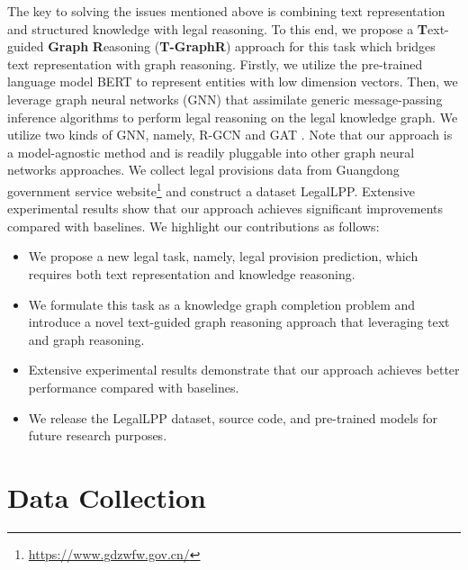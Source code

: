 \documentclass[runningheads]{llncs}
\begin{document}
The key to solving the issues mentioned above is combining text representation and structured knowledge with legal reasoning. To this end, we propose a \textbf{T}ext-guided \textbf{Graph} \textbf{R}easoning (\textbf{T-GraphR}) approach for this task which bridges text representation with graph reasoning. Firstly, we utilize the pre-trained language model BERT \cite{devlin2018bert} to represent entities with low dimension vectors. Then, we leverage graph neural networks (GNN) that assimilate generic message-passing inference algorithms to perform legal reasoning on the legal knowledge graph. We utilize two kinds of GNN, namely,  R-GCN \cite{schlichtkrull2018modeling} and  GAT \cite{velickovic2018graph}.  Note that our approach is a model-agnostic method and is readily pluggable into other graph neural networks approaches. 
We collect legal provisions data from Guangdong government service website\footnote{\url{https://www.gdzwfw.gov.cn/}}   and construct a dataset LegalLPP. Extensive experimental results show that our approach achieves significant improvements compared with baselines. We highlight our contributions as follows: 



\begin{itemize}
\item  We propose a new legal task, namely, legal provision prediction, which requires both text representation and knowledge reasoning. 
\item  We formulate this task as a knowledge graph completion problem and introduce a novel text-guided graph reasoning approach that leveraging text and graph reasoning.
\item  Extensive experimental results demonstrate that our approach achieves better performance compared with baselines.
\item  We release the LegalLPP dataset, source code, and pre-trained models for future research purposes.
\end{itemize}



\section{Data Collection}
\end{document}
